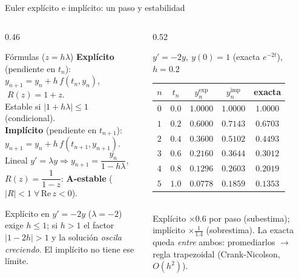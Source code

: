 \documentclass[aspectratio=169,10pt]{beamer}
\begin{document}
\begin{frame}{Euler explícito e implícito: un paso y estabilidad}
\begin{columns}[T]
\begin{column}{0.46\textwidth}
\begin{cardidea}{Fórmulas ($z=h\lambda$)}{\faSuperscript}
{\footnotesize \textbf{Explícito} (pendiente en $t_n$):\\[0.2mm]
$y_{n+1}=y_n+h\,f(t_n,y_n)$, $\;R(z)=1+z$.\\[0.2mm]
Estable si $|1+h\lambda|\le1$ (condicional).\\[0.9mm]
\textbf{Implícito} (pendiente en $t_{n+1}$):\\[0.2mm]
$y_{n+1}=y_n+h\,f(t_{n+1},y_{n+1})$.\\[0.2mm]
Lineal $y'=\lambda y\Rightarrow y_{n+1}=\dfrac{y_n}{1-h\lambda}$,\\[0.4mm]
$R(z)=\dfrac{1}{1-z}$: \textbf{A-estable} ($|R|<1\;\forall\,\mathrm{Re}\,z<0$).}
\end{cardidea}
\vspace{1mm}
\begin{cardnota}[\faExclamationTriangle]
{\footnotesize Explícito en $y'=-2y$ ($\lambda=-2$) exige $h\le1$; si $h>1$ el factor $|1-2h|>1$ y la solución \emph{oscila creciendo}. El implícito no tiene ese límite.}
\end{cardnota}
\end{column}
\begin{column}{0.52\textwidth}
\begin{cardgear}{$y'=-2y,\ y(0)=1$ (exacta $e^{-2t}$), $h=0.2$}{\faTable}
\centering
{\footnotesize\renewcommand{\arraystretch}{1.28}\setlength{\tabcolsep}{5pt}
\begin{tabular}{c|c|c|c|c}
$n$ & $t_n$ & $y_n^{\text{exp}}$ & $y_n^{\text{imp}}$ & exacta\\\hline
$0$ & $0.0$ & $1.0000$ & $1.0000$ & $1.0000$\\
$1$ & $0.2$ & $0.6000$ & $0.7143$ & $0.6703$\\
$2$ & $0.4$ & $0.3600$ & $0.5102$ & $0.4493$\\
$3$ & $0.6$ & $0.2160$ & $0.3644$ & $0.3012$\\
$4$ & $0.8$ & $0.1296$ & $0.2603$ & $0.2019$\\
$5$ & $1.0$ & $0.0778$ & $0.1859$ & $0.1353$\\
\end{tabular}}\\[1.2mm]
{\footnotesize Explícito $\times0.6$ por paso (subestima); implícito $\times\tfrac{1}{1.4}$ (sobrestima). La exacta queda \emph{entre} ambos: promediarlos $\to$ regla trapezoidal (Crank-Nicolson, $O(h^2)$).}
\end{cardgear}
\end{column}
\end{columns}
\end{frame}
\end{document}
